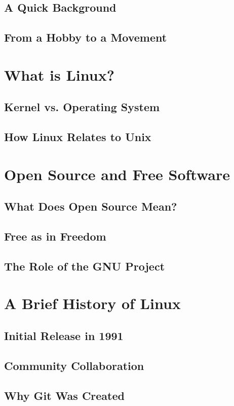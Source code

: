\documentclass[12pt, a4paper, oneside]{article}
\begin{document}
	\subsection{A Quick Background}
	\subsection{From a Hobby to a Movement}
	
	\section{What is Linux?}
	\subsection{Kernel vs. Operating System}
	\subsection{How Linux Relates to Unix}
	
	\section{Open Source and Free Software}
	\subsection{What Does Open Source Mean?}
	\subsection{Free as in Freedom}
	\subsection{The Role of the GNU Project}
	
	\section{A Brief History of Linux}
	\subsection{Initial Release in 1991}
	\subsection{Community Collaboration}
	\subsection{Why Git Was Created}
	
\end{document}

